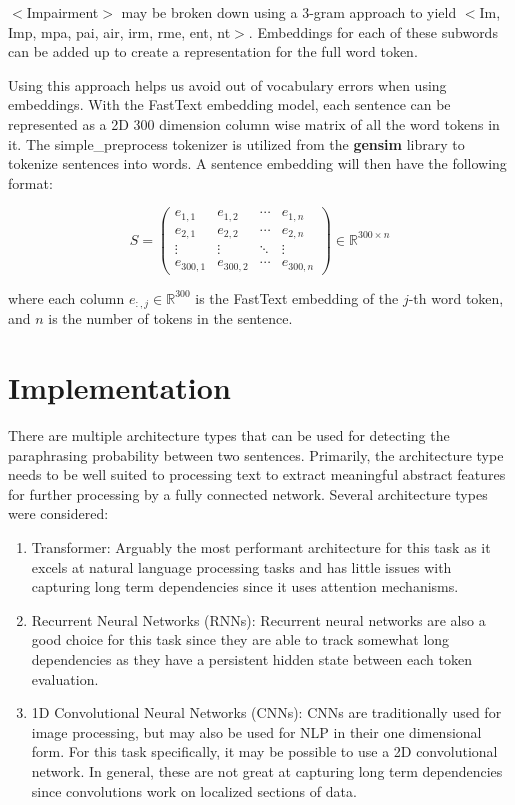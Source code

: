 \documentclass[11pt]{article}
\begin{document}
\(<\)Impairment\(>\) may be broken down using a 3-gram approach to yield \(<\)Im, Imp, mpa,
pai, air, irm, rme, ent, nt\(>\). Embeddings for each of these subwords can be added up to 
create a representation for the full word token. 

\bigskip
Using this approach helps us avoid out of vocabulary errors when using embeddings. With the FastText
embedding model, each sentence can be represented as a 2D 300 dimension column wise matrix of all the word tokens
in it. The simple\_preprocess tokenizer is utilized from the \textbf{gensim} library to tokenize
sentences into words. A sentence embedding will then have the following format:

\begin{equation}
S = \begin{pmatrix}
e_{1,1}   & e_{1,2}   & \cdots & e_{1,n}   \\
e_{2,1}   & e_{2,2}   & \cdots & e_{2,n}   \\
\vdots    & \vdots    & \ddots & \vdots    \\
e_{300,1} & e_{300,2} & \cdots & e_{300,n}
\end{pmatrix} \in \mathbb{R}^{300 \times n}
\end{equation}

\noindent where each column \(e_{:,j} \in \mathbb{R}^{300}\) is the FastText embedding of the \(j\)-th word token, and \(n\) is the number of tokens in the sentence.

\section{Implementation}
\label{sec:implementation}

There are multiple architecture types that can be used for detecting the paraphrasing probability
between two sentences. Primarily, the architecture type needs to be well suited to processing text 
to extract meaningful abstract features for further processing by a fully connected network. Several
architecture types were considered:
\begin{enumerate}
  \item Transformer: Arguably the most performant architecture for this task as it excels at natural language 
  processing tasks and has little issues with capturing long term dependencies since it uses attention mechanisms.
  \item Recurrent Neural Networks (RNNs): Recurrent neural networks are also a good choice for this task since they
  are able to track somewhat long dependencies as they have a persistent hidden state between each token evaluation.
  \item 1D Convolutional Neural Networks (CNNs): CNNs are traditionally used for image processing, but may also be used
  for NLP in their one dimensional form. For this task specifically, it may be possible to use a 2D convolutional
  network. In general, these are not great at capturing long term dependencies since convolutions work on localized
  sections of data. 
\end{enumerate}
\end{document}
